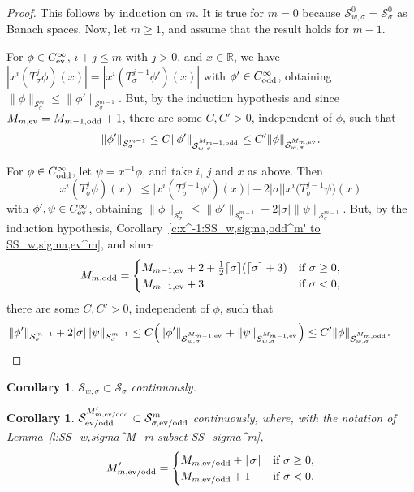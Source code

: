 \documentclass[pdftex]{sigma}
\newtheorem{Corollary}[Theorem]{Corollary}
\newcommand{\R}{\mathbb{R}}
\renewcommand{\SS}{\mathcal{S}}
\newcommand{\Cinf}{C^\infty}
\begin{document}
\begin{proof}
  This follows by induction on $m$. It is true for $m=0$ because $\SS_{w,\sigma}^0=\SS_\sigma^0$ as Banach spaces. Now, let $m\ge1$, and assume that the result holds for $m-1$.

  For $\phi\in\Cinf_{\text{\rm ev}}$, $i+j\le m$ with $j>0$, and $x\in\R$, we have $|x^i(T_\sigma^j\phi)(x)|=|x^i(T_\sigma^{j-1}\phi')(x)|$ with $\phi'\in \Cinf_{\text{\rm odd}}$, obtaining $\|\phi\|_{\SS_\sigma^m}\le\|\phi'\|_{\SS_\sigma^{m-1}}$. But, by the induction hypothesis and since $M_{m,\text{\rm ev}}=M_{m-1,\text{\rm odd}}+1$, there are some $C,C'>0$, independent of $\phi$, such that
    \[
      \|\phi'\|_{\SS_\sigma^{m-1}}\le C \|\phi'\|_{\SS_{w,\sigma}^{M_{m-1,\text{\rm odd}}}}\le C' \|\phi\|_{\SS_{w,\sigma}^{M_{m,\text{\rm ev}}}} .
    \]

  For $\phi\in \Cinf_{\text{\rm odd}}$, let $\psi=x^{-1}\phi$, and take $i$, $j$ and $x$ as above. Then
    \[
      \big|x^i(T_\sigma^j\phi)(x)\big|\le \big|x^i(T_\sigma^{j-1}\phi')(x)\big|
      +2 |\sigma|\big|x^i\big(T_\sigma^{j-1}\psi\big)(x)\big|
    \]
  with $\phi',\psi\in\Cinf_{\text{\rm ev}}$, obtaining $\|\phi\|_{\SS_\sigma^m}\le\|\phi'\|_{\SS_\sigma^{m-1}}+2 |\sigma| \|\psi\|_{\SS_\sigma^{m-1}}$. But, by the induction hypothesis, Corollary~\ref{c:x^-1:SS_w,sigma,odd^m' to SS_w,sigma,ev^m}, and since
    \[
      M_{m,\text{\rm odd}}=
        \begin{cases}
          M_{m-1,\text{\rm ev}}+2+\frac{1}{2}\lceil\sigma\rceil(\lceil\sigma\rceil+3) & \text{if $\sigma\ge0$},\\
          M_{m-1,\text{\rm ev}}+3 & \text{if $\sigma<0$} ,
        \end{cases}
    \]
  there are some $C,C'>0$, independent of $\phi$, such that
    \begin{gather*}
      \|\phi'\|_{\SS_\sigma^{m-1}}+2 |\sigma| \|\psi\|_{\SS_\sigma^{m-1}}
      \le C\Big(\|\phi'\|_{\SS_{w,\sigma}^{M_{m-1,\text{\rm ev}}}}
      +\|\psi\|_{\SS_{w,\sigma}^{M_{m-1,\text{\rm ev}}}}\Big)
      \le C' \|\phi\|_{\SS_{w,\sigma}^{M_{m,\text{\rm odd}}}} .\tag*{\qed}
    \end{gather*}
\renewcommand{\qed}{}
\end{proof}

\begin{Corollary}\label{c:SS_w,sigma subset SS_sigma}
  $\SS_{w,\sigma}\subset\SS_\sigma$ continuously.
\end{Corollary}

\begin{Corollary}\label{l:SS_ev/odd^M_m,ev/odd subset SS_sigma,ev/odd^m}
  $\SS_{\text{\rm ev/odd}}^{M'_{m,\text{\rm ev/odd}}}\subset\SS_{\sigma,\text{\rm ev/odd}}^m$ continuously, where, with the notation of Lemma~{\rm \ref{l:SS_w,sigma^M_m subset SS_sigma^m}},
    \[
      M'_{m,\text{\rm ev/odd}}=
        \begin{cases}
          M_{m,\text{\rm ev/odd}}+\lceil\sigma\rceil & \text{if $\sigma\ge0$},\\
          M_{m,\text{\rm ev/odd}}+1 & \text{if $\sigma<0$} .
        \end{cases}
    \]
\end{Corollary}
\end{document}
